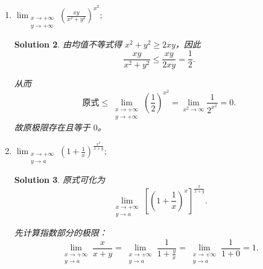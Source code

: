 \documentclass[a4paper,12pt]{article}
\newtheorem*{sol}{Solution}
\begin{document}
\begin{enumerate}
\begin{enumerate}[label=(\arabic*)]
\begin{sol}
                              由于 $xy \to 0$（当 $x \to 0, y \to a$ 时），由等价无穷小替换得 $\sin xy \sim xy$，因此
                              $$
                                    \lim_{\substack{x \to 0 \\ y \to a}} \frac{xy}{xy} \cdot y = \lim_{\substack{x \to 0 \\ y \to a}} y = a.
                              $$
                              故原极限存在且等于 $a$。
                        \end{sol}
                  \item $\lim_{\substack{x \to +\infty \\ y \to +\infty}} \left( \frac{xy}{x^2 + y^2} \right)^{x^2}$;
                        \begin{sol}
                              由均值不等式得 $x^2 + y^2 \geq 2xy$，因此
                              $$
                                    \frac{xy}{x^2 + y^2} \leq \frac{xy}{2xy} = \frac{1}{2}.
                              $$

                              从而
                              $$
                                    \text{原式} \leq \lim_{\substack{x \to +\infty \\ y \to +\infty}} \left(\frac{1}{2}\right)^{x^2} = \lim_{x^2\to\infty}\frac{1}{2^{x^2}} = 0.
                              $$
                              故原极限存在且等于 $0$。
                        \end{sol}
                  \item $\lim_{\substack{x \to +\infty \\ y \to a}} \left( 1 + \frac{1}{x} \right)^{\frac{x^2}{x+y}}$;
                        \begin{sol}
                              原式可化为
                              $$
                                    \lim_{\substack{x \to +\infty \\ y \to a}} \left[\left( 1 + \frac{1}{x} \right)^x\right]^{\frac{x}{x+y}}.
                              $$

                              先计算指数部分的极限：
                              $$
                                    \lim_{\substack{x \to +\infty \\ y \to a}} \frac{x}{x+y} = \lim_{\substack{x \to +\infty \\ y \to a}} \frac{1}{1+\frac{y}{x}} = \lim_{\substack{x \to +\infty \\ y \to a}} \frac{1}{1+0} = 1.
                              $$


\end{sol}
\end{enumerate}
\end{enumerate}
\end{document}
